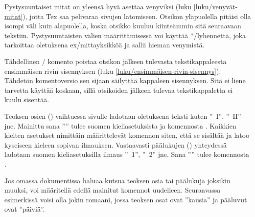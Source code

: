 \begin{koodilohkosis}
\end{koodilohkosis}

Pystysuuntaiset mitat on yleensä hyvä asettaa venyviksi (luku
\ref{luku/venyvät-mitat}), jotta Tex saa pelivaraa sivujen latomiseen.
Otsikon yläpuolella pitäisi olla isompi väli kuin alapuolella, koska
otsikko kuuluu kiinteämmin sitä seuraavaan tekstiin. Pystysuuntaisten
välien määrittämisessä voi käyttää *\=/lyhennettä, joka tarkoittaa
oletuksena ex\-/mittayksikköä ja sallii hieman venymistä.

\begin{koodilohkosis}
\end{koodilohkosis}

Tähdellinen \-/ komento poistaa otsikon jälkeen
tulevasta tekstikappaleesta ensimmäisen rivin sisennyksen (luku
\ref{luku/ensimmäisen-rivin-sisennys}). Tähdetön komentoversio
 sen sijaan säilyttää kappaleen sisennyksen. Sitä
ei liene tarvetta käyttää koskaan, sillä otsikoiden jälkeen tulevaa
tekstikappaletta ei kuulu sisentää.

Teoksen osien () vaihtuessa sivulle ladotaan oletuksena
teksti kuten ''\partname~I'', ''\partname~II'' jne. Mainittu sana
''\partname'' tulee suomen kieliasetuksista ja komennosta
. Kaikkien kielten asetukset nimittäin määrittelevät
komennon  siten, että se sisältää ja latoo kyseiseen
kieleen sopivan ilmauksen. Vastaavasti päälukujen ()
yhteydessä ladotaan suomen kieliasetuksilla ilmaus ''\chaptername~1'',
''\chaptername~2'' jne. Sana ''\chaptername'' tulee komennosta
.

Jos omassa dokumentissa haluaa kutsua teoksen osia tai päälukuja
joksikin muuksi, voi määritellä edellä mainitut komennot uudelleen.
Seuraavassa esimerkissä voisi olla jokin romaani, jossa teoksen osat
ovat ''kausia'' ja pääluvut ovat ''päiviä''.

\begin{koodilohkosis}
\addto{\captionsfinnish}{
  \renewcommand{\partname}{Kausi}
  \renewcommand{\chaptername}{Päivä}
}
\end{koodilohkosis}

